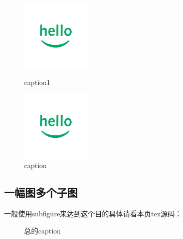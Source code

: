 \begin{figure}[htbp]
\begin{minipage}{0.5\linewidth}
\centering
\includegraphics[width=0.3\textwidth]{hello.png}
\caption{caption1}
\label{hello1}
\end{minipage}%
\begin{minipage}{0.5\linewidth}
\centering
\includegraphics[width=0.3\textwidth]{hello.png}
\caption{caption}
\label{hello2}
\end{minipage}
\end{figure}

\subsection{一幅图多个子图}

一般使用subfigure来达到这个目的具体请看本页tex源码：

\begin{figure}[htb]
  \centering
    \caption{总的caption}
  \label{hello5} %
\end{figure}